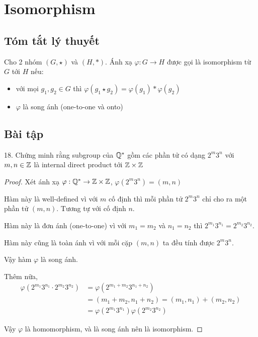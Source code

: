 \section*{Isomorphism}

\subsection*{Tóm tắt lý thuyết}

Cho 2 nhóm $(G, \star)$ và $(H, *)$. Ánh xạ $\varphi: G \rightarrow H$ được gọi là isomorphism từ $G$ tới $H$ nếu:

\begin{itemize}
    \item với mọi $g_1, g_2 \in G$ thì $\varphi(g_1 \star g_2) = \varphi(g_1) * \varphi(g_2)$
    \item $\varphi$ là song ánh (one-to-one và onto)
\end{itemize}

\subsection*{Bài tập}

18. Chứng minh rằng subgroup của $\mathbb{Q}^*$ gồm các phần tử có dạng $2^m 3^n$ với $m, n \in \mathbb{Z}$ là internal direct product tới $\mathbb{Z} \times \mathbb{Z}$

\begin{proof}
    Xét ánh xạ $\varphi: \mathbb{Q}^* \rightarrow \mathbb{Z} \times \mathbb{Z}$, $\varphi(2^m 3^n) = (m, n)$

    Hàm này là well-defined vì với $m$ cố định thì mỗi phần tử $2^m 3^n$ chỉ cho ra một phần tử $(m, n)$. Tương tự với cố định $n$.

    Hàm này là đơn ánh (one-to-one) vì với $m_1 = m_2$ và $n_1 = n_2$ thì $2^{m_1} 3^{n_1} = 2^{m_2} 3^{n_2}$.

    Hàm này cũng là toàn ánh vì với mỗi cặp $(m, n)$ ta đều tính được $2^m 3^n$.

    Vậy hàm $\varphi$ là song ánh.

    Thêm nữa, 
    \begin{align*}
        \varphi(2^{m_1} 3^{n_1} \cdot 2^{m_2} 3^{n_2})& = \varphi(2^{m_1 + m_2} 3^{n_1 + n_2}) \\
        & = (m_1 + m_2, n_1 + n_2) = (m_1, n_1) + (m_2, n_2) \\
        & = \varphi(2^{m_1} 3^{n_1}) \varphi(2^{m_2} 3^{n_2})
    \end{align*}

    Vậy $\varphi$ là homomorphism, và là song ánh nên là isomorphism.

    \end{proof}

